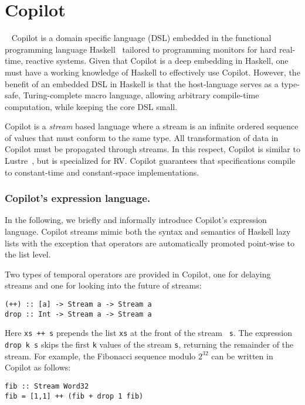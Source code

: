 \section{Copilot}~\label{sec:co-intro} 
Copilot is a domain specific language (DSL)  embedded in the functional
programming language Haskell~\cite{Haskell98}   tailored to
programming monitors for hard real-time, reactive systems. Given that
Copilot is a deep embedding in Haskell, one must have a working
knowledge of Haskell to effectively use Copilot. However, the benefit of an
embedded DSL in Haskell is that the host-language serves as a type-safe,
Turing-complete macro language, allowing arbitrary compile-time computation,
while keeping the core DSL small.

Copilot is a \emph{stream} based language where a stream is an infinite ordered
sequence of values that must conform to the same type.  All transformation of
data in Copilot must be propagated through streams.  In this respect, Copilot is
similar to Lustre~\cite{CaspiPHP87}, but is specialized for RV. Copilot
guarantees that specifications compile to constant-time and constant-space
implementations.

\subsubsection{Copilot's expression language.}
In the following, we briefly and informally introduce Copilot's expression
language.  Copilot streams mimic both the syntax and semantics of
Haskell lazy lists with the exception that  operators are
automatically promoted point-wise to the list level. 

Two types of temporal operators are provided in Copilot, one for
delaying streams and one for looking into the future of streams:
\begin{lstlisting}[frame=single]
(++) :: [a] -> Stream a -> Stream a
drop :: Int -> Stream a -> Stream a
\end{lstlisting}
%
Here {\tt xs ++ s} prepends the list {\tt xs} at the front of the stream {\tt
  s}.  The expression {\tt drop k s} skips the first {\tt k} values of the
stream {\tt s}, returning the remainder of the stream. For example, the
Fibonacci sequence modulo $2^{32}$ can be written in Copilot as follows:

\begin{lstlisting}[frame=single]
fib :: Stream Word32
fib = [1,1] ++ (fib + drop 1 fib)
\end{lstlisting}
%

